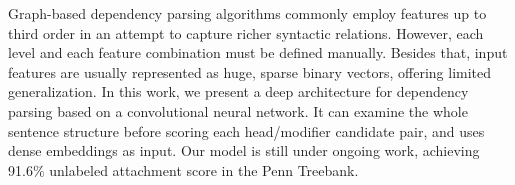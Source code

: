 Graph-based dependency parsing algorithms commonly employ features up to third order in an attempt to capture richer syntactic relations. However, each level and each feature combination must be defined manually. Besides that, input features are usually represented as huge, sparse binary vectors, offering limited generalization. In this work, we present a deep architecture for dependency parsing based on a convolutional neural network. It can examine the whole sentence structure before scoring each head/modifier candidate pair, and uses dense embeddings as input. Our model is still under ongoing work, achieving 91.6\% unlabeled attachment score in the Penn Treebank.
